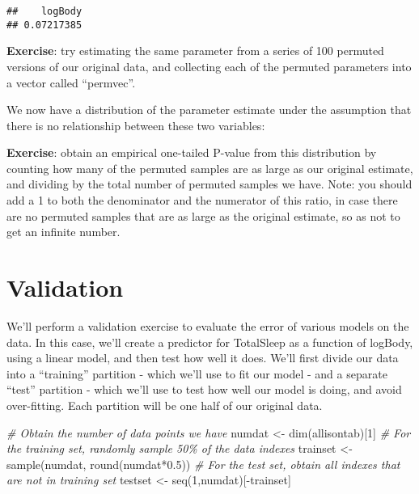 \documentclass[
]{book}
\newenvironment{Shaded}{\begin{snugshade}}{\end{snugshade}}
\newcommand{\AttributeTok}[1]{\textcolor[rgb]{0.77,0.63,0.00}{#1}}
\newcommand{\CommentTok}[1]{\textcolor[rgb]{0.56,0.35,0.01}{\textit{#1}}}
\newcommand{\DecValTok}[1]{\textcolor[rgb]{0.00,0.00,0.81}{#1}}
\newcommand{\FloatTok}[1]{\textcolor[rgb]{0.00,0.00,0.81}{#1}}
\newcommand{\FunctionTok}[1]{\textcolor[rgb]{0.00,0.00,0.00}{#1}}
\newcommand{\NormalTok}[1]{#1}
\newcommand{\OtherTok}[1]{\textcolor[rgb]{0.56,0.35,0.01}{#1}}
\newcommand{\SpecialCharTok}[1]{\textcolor[rgb]{0.00,0.00,0.00}{#1}}
\begin{document}
\begin{Shaded}
\end{Shaded}

\begin{verbatim}
##    logBody 
## 0.07217385
\end{verbatim}

\textbf{Exercise}: try estimating the same parameter from a series of 100 permuted versions of our original data, and collecting each of the permuted parameters into a vector called ``permvec''.

We now have a distribution of the parameter estimate under the assumption that there is no relationship between these two variables:

\textbf{Exercise}: obtain an empirical one-tailed P-value from this distribution by counting how many of the permuted samples are as large as our original estimate, and dividing by the total number of permuted samples we have. Note: you should add a 1 to both the denominator and the numerator of this ratio, in case there are no permuted samples that are as large as the original estimate, so as not to get an infinite number.

\hypertarget{validation}{%
\section{Validation}\label{validation}}

We'll perform a validation exercise to evaluate the error of various models on the data. In this case, we'll create a predictor for TotalSleep as a function of logBody, using a linear model, and then test how well it does. We'll first divide our data into a ``training'' partition - which we'll use to fit our model - and a separate ``test'' partition - which we'll use to test how well our model is doing, and avoid over-fitting. Each partition will be one half of our original data.

\begin{Shaded}
\begin{Highlighting}[]
\CommentTok{\# Obtain the number of data points we have}
\NormalTok{numdat }\OtherTok{\textless{}{-}} \FunctionTok{dim}\NormalTok{(allisontab)[}\DecValTok{1}\NormalTok{]}
\CommentTok{\# For the training set, randomly sample 50\% of the data indexes}
\NormalTok{trainset }\OtherTok{\textless{}{-}} \FunctionTok{sample}\NormalTok{(numdat, }\FunctionTok{round}\NormalTok{(numdat}\SpecialCharTok{*}\FloatTok{0.5}\NormalTok{))}
\CommentTok{\# For the test set, obtain all indexes that are not in training set}
\NormalTok{testset }\OtherTok{\textless{}{-}} \FunctionTok{seq}\NormalTok{(}\DecValTok{1}\NormalTok{,numdat)[}\SpecialCharTok{{-}}\NormalTok{trainset]}
\end{Highlighting}
\end{Shaded}
\end{document}
